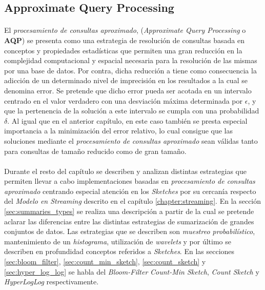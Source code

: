 \documentclass{subfiles}
\begin{document}
      \subsection{Approximate Query Processing}
      \label{sec:aproximate_query_processing}

        \paragraph{}
        El \emph{procesamiento de consultas aproximado}, (\emph{Approximate Query Processing} o \textbf{AQP}) se presenta como una estrategia de resolución de consultas basada en conceptos y propiedades estadísticas que permiten una gran reducción en la complejidad computacional y espacial necesaria para la resolución de las mismas por una base de datos. Por contra, dicha reducción a tiene como consecuencia la adicción de un determinado nivel de imprecisión en los resultados a la cual se denomina error. Se pretende que dicho error pueda ser acotada en un intervalo centrado en el valor verdadero con una desviación máxima determinada por $\epsilon$, y que la pertenencia de la solución a este intervalo se cumpla con una probabilidad $\delta$. Al igual que en el anterior capítulo, en este caso también se presta especial importancia a la minimización del error relativo, lo cual consigue que las soluciones mediante el \emph{procesamiento de consultas aproximado} sean válidas tanto para consultas de tamaño reducido como de gran tamaño.


      \paragraph{}
      Durante el resto del capítulo se describen y analizan distintas estrategias que permiten llevar a cabo implementaciones basadas en \emph{procesamiento de consultas aproximado} centrando especial atención en los \emph{Sketches} por su cercanía respecto del \emph{Modelo en Streaming} descrito en el capítulo \ref{chapter:streaming}. En la sección \ref{sec:summaries_types} se realiza una descripción a partir de la cual se pretende aclarar las diferencias entre las distintas estrategias de sumarización de grandes conjuntos de datos. Las estrategias que se describen son \emph{muestreo probabilístico}, mantenimiento de un \emph{histograma}, utilización de \emph{wavelets} y por último se describen en profundidad conceptos referidos a \emph{Sketches}. En las secciones \ref{sec:bloom_filter}, \ref{sec:count_min_sketch}, \ref{sec:count_sketch} y \ref{sec:hyper_log_log} se habla del \emph{Bloom-Filter} \emph{Count-Min Sketch}, \emph{Count Sketch} y \emph{HyperLogLog} respectivamente.
\end{document}
